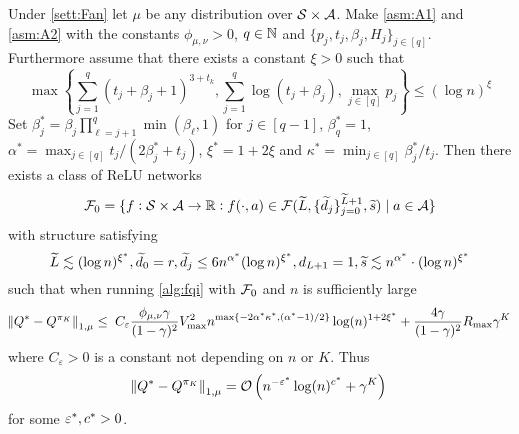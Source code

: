 \begin{thm} \label{thm:main}
  Under \cref{sett:Fan}
  let $\mu$ be any distribution over $\mathcal{S} \times \mathcal{A}$.
  Make \cref{asm:A1} and \cref{asm:A2} with the
  constants $\phi_{\mu, \nu} > 0$, $q \in \mathbb{N}$ and
  $\{p_j, t_j, \beta_j, H_j\}_{j \in [q]}$. Furthermore assume
  that there exists a constant $\xi > 0$ such that
  \[ \max \left\{ \sum_{j=1}^q (t_j + \beta_j + 1)^{3 + t_k},
      \sum_{j=1}^q \log (t_j + \beta_j),
      \max_{j \in [q]} p_j
  \right\} \leq (\log n)^\xi \] 
  Set $\beta^*_j = \beta_j \prod_{\ell = j+1}^q \min(\beta_\ell, 1)$
  for $j\in [q-1]$, $\beta^*_q = 1$,
  $\alpha^* = \max_{j \in [q]} t_j/(2\beta^*_j + t_j)$, 
  $\xi^* = 1 + 2\xi$ and $\kappa^* = \min_{j\in [q]} \beta^*_j/t_j$.
  Then there exists a class of ReLU networks
  \[ \mathcal{F}_0 = \{f : \mathcal{S} \times \mathcal{A} \to \mathbb{R} : f(\cdot, a) \in 
  \mathcal{F}(\widetilde{L}, \{\widetilde{d}_j\}_{j=0}^{\widetilde{L}+1},\widetilde{s}) \mid a \in \mathcal{A} \} \]
  with structure satisfying
  \[ \widetilde{L} \lesssim (\log n)^{\xi^*},
    \widetilde{d}_0 = r, \widetilde{d}_j \leq 6 n^{\alpha^*} (\log n)^{\xi^*},
  d_{L+1} = 1, \widetilde{s} \lesssim n^{\alpha^*} \cdot (\log n)^{\xi^*} \]
  such that when running \cref{alg:fqi} with $\mathcal{F}_0$
  and $n$ is sufficiently large
  \[ \norm{Q^* - Q^{\pi_K}}_{1, \mu} \leq \;
    C_{\varepsilon} \frac{\phi_{\mu, \nu} \gamma}{(1-\gamma)^2} V_{\max}^2
    n^{\max\{-2\alpha^*\kappa^*, (\alpha^*  - 1)/2 \}} \log(n)^{1+2\xi^*}
    + \frac{4 \gamma}{(1-\gamma)^2} R_{\max} \gamma^K
  \]
  where $C_{\varepsilon}>0$ is a constant not depending on $n$ or $K$.
  Thus
  \[ \norm{Q^* - Q^{\pi_K}}_{1, \mu} =
  \mathcal{O}\left( n^{-\varepsilon^*} \log(n)^{c^*} + \gamma^K \right) \]
  for some $\varepsilon^*, c^* > 0$.
\end{thm}


